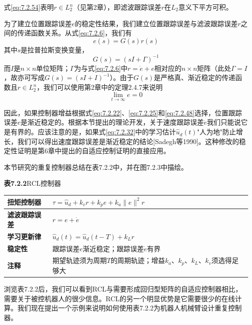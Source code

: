 \documentclass[UTF8]{ctexart}
\begin{document}
式\eqref{eq:7.2.54}表明$r\in L_2^n$（见第2章），即滤波跟踪误差$r$在$L_2$意义下平方可积。

为了建立位置跟踪误差$e$的稳定性结果，我们建立位置跟踪误差与滤波跟踪误差$r$之间的传递函数关系。从式\eqref{eq:7.2.6}，我们有
\begin{equation}\label{eq:7.2.55}
e(s) = G(s)r(s)
\end{equation}
其中$s$是拉普拉斯变换变量，
\begin{equation}\label{eq:7.2.56}
G(s) = (sI + \Gamma)^{-1}
\end{equation}
而$I$是$n \times n$单位矩阵；$\Gamma$为与式\eqref{eq:7.2.6}中$r=\dot{e}+e$相对应的$n\times n$矩阵（此处$\Gamma=I$，故亦可写成$G(s)=(sI+I)^{-1}$）。由于$G(s)$是严格真、渐近稳定的传递函数且$r\in L_2^n$，我们可以使用第2章中的定理2.4.7来说明
\begin{equation}\label{eq:7.2.57}
\lim_{t \to \infty} e = 0
\end{equation}

因此，如果控制器增益根据式\eqref{eq:7.2.22}、\eqref{eq:7.2.25}和\eqref{eq:7.2.48}选择，位置跟踪误差$e$是渐近稳定的。根据本节提出的理论开发，关于速度跟踪误差$\dot{e}$我们只能说它是有界的。应该注意的是，如果式\eqref{eq:7.2.32}中的学习估计$\hat{u}_d(t)$"人为地"防止增长，我们可以得出速度跟踪误差是渐近稳定的结论[Sadegh等1990]。这种修改的稳定性证明是第6章中提出的自适应控制证明的直接应用。

本节研究的重复控制器总结在表7.2.2中，并在图7.2.3中描绘。

\textbf{表7.2.2}\quad RCL控制器

\begin{center}
\begin{tabular}{|l|l|}
\hline
\textbf{扭矩控制器} & $\tau = \hat{u}_d + k_v r + k_p e + k_a \|e\|^2 r$ \\
\hline
\textbf{滤波跟踪误差} & $r = e + \dot{e}$ \\
\hline
\textbf{学习更新律} & $\hat{u}_d(t) = \hat{u}_d(t-T) + k_L r$ \\
\hline
\textbf{稳定性} & 跟踪误差$e$渐近稳定；跟踪误差$\dot{e}$有界 \\
\hline
\textbf{注释} & 期望轨迹须为周期$T$的周期轨迹；增益$k_a$、$k_p$、$k_L$、$k_v$须选得足够大 \\
\hline
\end{tabular}
\end{center}

浏览表7.2.2后，我们可以看到RCL与需要形成回归型矩阵的自适应控制器相比，需要关于被控机器人的很少信息。RCL的另一个明显优势是它需要很少的在线计算。我们现在提出一个示例来说明如何使用表7.2.2为机器人机械臂设计重复控制器。
\end{document}
